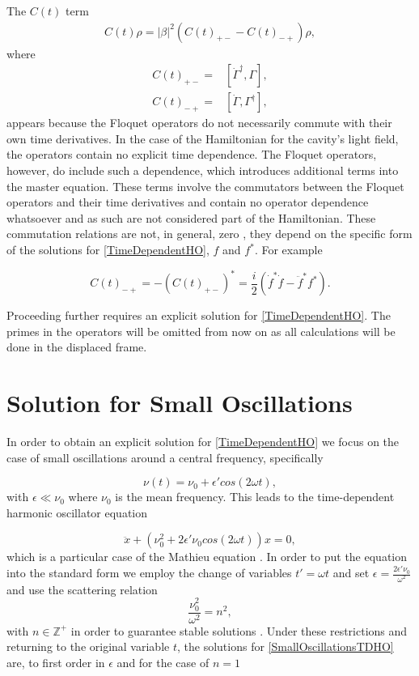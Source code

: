 \documentclass[reprint, amsmath,amssymb, aps,pra]{revtex4-1}
\begin{document}
The $C(t)$ term
 \begin{align}
C(t)\rho = |\beta|^2(C(t)_{+-} - C(t)_{-+})\rho \nonumber,
 \end{align}
 where
\begin{align*}
C(t)_{+-} =& [\dot{\Gamma}^{\dagger}, \Gamma],\\
C(t)_{-+} =& [\dot{\Gamma}, \Gamma^{\dagger}],
\end{align*}
appears because the Floquet operators do not necessarily commute with
their own time derivatives. In the case of the Hamiltonian for the
cavity's light field, the operators contain no explicit time
dependence. The Floquet operators, however,
do include such a dependence, which introduces additional terms into
the master equation. These terms involve the commutators between the
Floquet operators and their time derivatives and contain no operator
dependence whatsoever and as such are not considered part of the
Hamiltonian. These commutation relations are not, in general, zero
\cite{TesisMaestria}, they depend on the specific form of the
solutions for \eqref{TimeDependentHO}, $f$ and $f^*$. For example

\begin{equation}
C(t)_{-+} = -(C(t)_{+-})^* = \frac{i}{2}(\dot{f}^* \dot{f} - \ddot{f}^*f^*).
\end{equation}



Proceeding further requires an explicit solution for
\eqref{TimeDependentHO}. The primes in the operators will be omitted
from now on as all calculations will be done in the displaced frame.


\section{Solution for Small Oscillations}\label{SolSmallOsc}
 
 In order to obtain an explicit solution for \eqref{TimeDependentHO} we focus on the case of small oscillations around a central frequency, specifically

\begin{equation}\label{SmallOscillationsTDHO}
\nu(t) = \nu_0 + \epsilon' cos(2\omega t),
\end{equation} with $\epsilon \ll \nu_0$ where $\nu_0$ is the mean frequency. This leads to the time-dependent harmonic oscillator equation

\begin{equation}
\ddot{x} + (\nu_0^2 + 2\epsilon' \nu_0 cos(2\omega t))x = 0,
\end{equation}
which is a particular case of the Mathieu equation \cite{PiatekME}. In
order to put the equation into the standard form we employ the change
of variables $t'= \omega t$ and set
$\epsilon = \frac{2\epsilon' \nu_0}{\omega^2}$ and use the scattering
relation
\begin{equation}
\frac{\nu_0^2}{\omega^2} = n^2,\label{scattering}
\end{equation}
with $n \in \mathbb{Z}^+$ in order to guarantee stable solutions
\cite{WardFT}. Under these restrictions and returning to the original
variable $t$, the solutions for \eqref{SmallOscillationsTDHO} are, to
first order in $\epsilon$ and for the case of $n=1$
\end{document}
